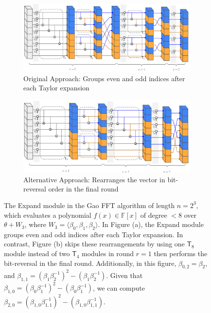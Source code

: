 \begin{figure}
	\centering
	\begin{subfigure}[b]{0.9\linewidth} %
		\centering
		\includegraphics[width=0.9\linewidth]{Figures/Gao_expand.pdf} 
		\caption{ Original Approach: Groups even and odd indices after each Taylor expansion}
		\label{fig:gao-expand-old}
	\end{subfigure}
	\vspace{1em} %
	\begin{subfigure}[b]{0.9\linewidth} %
		\centering
		\includegraphics[width=0.9\linewidth]{Figures/Gao_expand_binary.pdf} 
		\caption{ Alternative Approach: Rearranges the vector in bit-reversal order in the final round}
		\label{fig:gao-expand-binary}
	\end{subfigure}
	
	\caption[The \textsf{Expand} module in the Gao FFT algorithm]{The \textsf{Expand} module in the Gao FFT algorithm of length $n=2^3$, which evaluates a polynomial $f(x) \in \mathbb{F}[x]$ of degree $< 8$ over $\theta + W_3$, where $W_3 = \langle \beta_0, \beta_1, \beta_2 \rangle$. 
		In Figure (a), the \textsf{Expand} module groups even and odd indices after each Taylor expansion. In contrast, Figure (b) skips these rearrangements by using one $\textsf{T}_8$ module instead of two $\textsf{T}_4$ modules in round $r=1$ then performs the bit-reversal in the final round. 
		 Additionally, in this figure, $\beta_{0,2} = \beta_2$, and $\beta_{1,1} = (\beta_1 \beta_2^{-1})^2 -  (\beta_1 \beta_2^{-1})$. Given that $\beta_{1,0} = (\beta_0 \beta_1^{-1})^2 -  (\beta_0 \beta_1^{-1})$, we can compute $\beta_{2,0} = (\beta_{1,0} \beta_{1,1}^{-1})^2 -  (\beta_{1,0} \beta_{1,1}^{-1})$.
	}
	
	\label{fig:gao-expand}
\end{figure}

